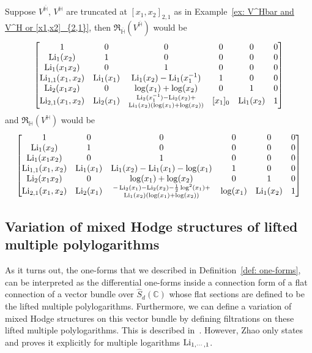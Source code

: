 \begin{example}
Suppose $V^{\overline{\mathbb H}}$, $V^{\mathbb H}$ are truncated at $[x_1,x_2]_{2,1}$ as in Example~\ref{ex: V^Hbar and V^H or [x1,x2]_{2,1}}, then $\Re_{\overline{\mathbb H}}(V^{\overline{\mathbb H}})$ would be
\begin{equation}
\begin{bmatrix}
1&0&0&0&0&0\\
\operatorname{Li}_1(x_2)&1&0&0&0&0\\
\operatorname{Li}_1(x_1x_2)&0&1&0&0&0\\
\operatorname{Li}_{1,1}(x_1,x_2)&\operatorname{Li}_1(x_1)&\operatorname{Li}_1(x_2)-\operatorname{Li}_1(x_1^{-1})&1&0&0\\
\operatorname{Li}_2(x_1x_2)&0&\log(x_1)+\log(x_2)&0&1&0\\
\operatorname{Li}_{2,1}(x_1,x_2)&\operatorname{Li}_2(x_1)&\substack{\operatorname{Li}_2(x_1^{-1})-\operatorname{Li}_2(x_2)+\\\operatorname{Li}_1(x_2)(\log(x_1)+\log(x_2))}&[x_1]_0&\operatorname{Li}_1(x_2)&1
\end{bmatrix}
\end{equation}
and $\Re_{\mathbb H}(V^{\mathbb H})$ would be
\begin{equation}
\begin{bmatrix}
1&0&0&0&0&0\\
\operatorname{Li}_1(x_2)&1&0&0&0&0\\
\operatorname{Li}_1(x_1x_2)&0&1&0&0&0\\
\operatorname{Li}_{1,1}(x_1,x_2)&\operatorname{Li}_1(x_1)&\operatorname{Li}_1(x_2)-\operatorname{Li}_1(x_1)-\log(x_1)&1&0&0\\
\operatorname{Li}_2(x_1x_2)&0&\log(x_1)+\log(x_2)&0&1&0\\
\operatorname{Li}_{2,1}(x_1,x_2)&\operatorname{Li}_2(x_1)&\substack{-\operatorname{Li}_2(x_1)-\operatorname{Li}_2(x_2)-\frac{1}{2}\log^2(x_1)+\\\operatorname{Li}_1(x_2)(\log(x_1)+\log(x_2))}&\log(x_1)&\operatorname{Li}_1(x_2)&1
\end{bmatrix}
\end{equation}
\end{example}

\subsection{Variation of mixed Hodge structures of lifted multiple polylogarithms}

As it turns out, the one-forms that we described in Definition~\ref{def: one-forms}, can be interpreted as the differential one-forms inside a connection form of a flat connection of a vector bundle over $\widehat S_d(\mathbb C)$ whose flat sections are defined to be the lifted multiple polylogarithms. Furthermore, we can define a variation of mixed Hodge structures on this vector bundle by defining filtrations on these lifted multiple polylogarithms. This is described in~\cite{Zhao_MultipleZetaFunctionsMultiplePolylogarithmsAndTheirSpecialValues}. However, Zhao only states and proves it explicitly for multiple logarithms $\operatorname{Li}_{1,\cdots,1}$.

